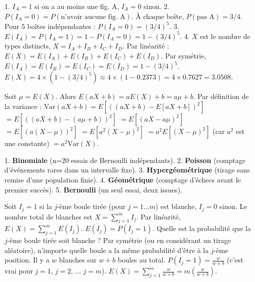 \begin{correctionbox}
1. $I_A = 1$ si on a au moins une fig. A, $I_A = 0$ sinon.
2. $P(I_A=0) = P(\text{n'avoir aucune fig. A})$. À chaque boîte, $P(\text{pas A}) = 3/4$.
Pour 5 boîtes indépendantes : $P(I_A=0) = (3/4)^5$.
3. $E(I_A) = P(I_A=1) = 1 - P(I_A=0) = 1 - (3/4)^5$.
4. $X$ est le nombre de types distincts, $X = I_A + I_B + I_C + I_D$.
Par linéarité : $E(X) = E(I_A) + E(I_B) + E(I_C) + E(I_D)$.
Par symétrie, $E(I_A) = E(I_B) = E(I_C) = E(I_D) = 1 - (3/4)^5$.
$E(X) = 4 \times \left( 1 - (3/4)^5 \right) \approx 4 \times (1 - 0.2373) = 4 \times 0.7627 = 3.0508$.
\end{correctionbox}

\begin{correctionbox}
Soit $\mu = E(X)$. Alors $E(aX+b) = aE(X)+b = a\mu+b$.
Par définition de la variance :
$\text{Var}(aX+b) = E\left[ ( (aX+b) - E[aX+b] )^2 \right]$
$= E\left[ ( (aX+b) - (a\mu+b) )^2 \right]$
$= E\left[ ( aX - a\mu )^2 \right]$
$= E\left[ ( a(X - \mu) )^2 \right]$
$= E\left[ a^2 (X - \mu)^2 \right]$
$= a^2 E\left[ (X - \mu)^2 \right]$ (car $a^2$ est une constante)
$= a^2 \text{Var}(X)$.
\end{correctionbox}

\begin{correctionbox}
1. \textbf{Binomiale} (n=20 essais de Bernoulli indépendants).
2. \textbf{Poisson} (comptage d'événements rares dans un intervalle fixe).
3. \textbf{Hypergéométrique} (tirage sans remise d'une population finie).
4. \textbf{Géométrique} (comptage d'échecs avant le premier succès).
5. \textbf{Bernoulli} (un seul essai, deux issues).
\end{correctionbox}

\begin{correctionbox}
Soit $I_j = 1$ si la $j$-ème boule tirée (pour $j=1 \dots m$) est blanche, $I_j=0$ sinon.
Le nombre total de blanches est $X = \sum_{j=1}^m I_j$.
Par linéarité, $E(X) = \sum_{j=1}^m E(I_j)$.
$E(I_j) = P(I_j=1)$. Quelle est la probabilité que la $j$-ème boule tirée soit blanche ?
Par symétrie (ou en considérant un tirage aléatoire), n'importe quelle boule a la même probabilité d'être à la $j$-ème position. Il y a $w$ blanches sur $w+b$ boules au total.
$P(I_j=1) = \frac{w}{w+b}$ (c'est vrai pour $j=1$, $j=2$, ... $j=m$).
$E(X) = \sum_{j=1}^m \frac{w}{w+b} = m \left( \frac{w}{w+b} \right)$.
\end{correctionbox}

